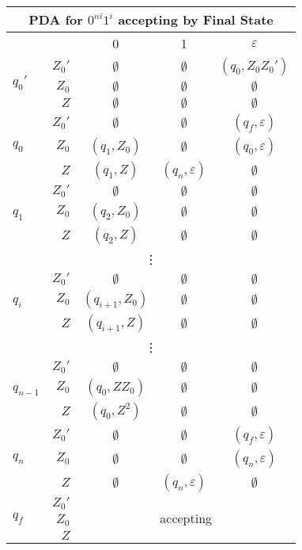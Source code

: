 \begin{center}\begin{tabular}{l r c c c}
    \multicolumn{5}{c}{PDA for \(0^{ni} 1^i\) accepting by Final State}\\\bottomrule
    & & 0 & 1 & \(\varepsilon \) \\\cmidrule{3-5}
    \multirow{3}{*}{\(q_0'\)} & \(Z_0'\) & \(\emptyset \) & \(\emptyset \) & \((q_0, Z_0 Z_0')\) \\
    & \(Z_0\) & \(\emptyset \) & \(\emptyset \) & \(\emptyset \) \\
    & \(Z\) & \(\emptyset \) & \(\emptyset \) & \(\emptyset \) \\\midrule
    \multirow{3}{*}{\(q_0\)}  & \(Z_0'\) & \(\emptyset \) & \(\emptyset \) & \((q_f, \varepsilon)\) \\
    & \(Z_0\) & \((q_1, Z_0)\) & \(\emptyset \) & \((q_0, \varepsilon)\) \\
    & \(Z\) & \((q_1, Z)\) & \((q_n, \varepsilon) \) & \(\emptyset \) \\\midrule
    \multirow{3}{*}{\(q_1\)} & \(Z_0'\) & \(\emptyset \) & \(\emptyset \) & \(\emptyset \) \\
    & \(Z_0\) & \((q_2, Z_0)\) & \(\emptyset \) & \(\emptyset \) \\
    & \(Z\) & \((q_2, Z) \)  & \(\emptyset \) & \(\emptyset \) \\\midrule
    \multicolumn{5}{c}{\vdots}\\\midrule
    \multirow{3}{*}{\(q_i\)} & \(Z_0'\) & \(\emptyset \) & \(\emptyset \) & \(\emptyset \) \\
     & \(Z_0\) & \((q_{i+1}, Z_0)\) & \(\emptyset \) &  \(\emptyset \) \\
    & \(Z\) & \((q_{i+1}, Z) \) & \(\emptyset \) & \(\emptyset \) \\\midrule
    \multicolumn{5}{c}{\vdots}\\\midrule
    \multirow{3}{*}{\(q_{n-1}\)}  & \(Z_0'\) & \(\emptyset \) & \(\emptyset \) & \(\emptyset \) \\
    & \(Z_0\) & \((q_0, ZZ_0)\) & \(\emptyset \) & \(\emptyset \) \\
    & \(Z\)  & \((q_0, Z^2) \) & \(\emptyset \) & \(\emptyset \) \\\midrule
    \multirow{3}{*}{\(q_n\)} & \(Z_0'\) & \(\emptyset \) & \(\emptyset \) & \((q_f, \varepsilon)\) \\
     & \(Z_0\) & \(\emptyset \) & \(\emptyset \) & \((q_n, \varepsilon)\) \\
    & \(Z\) & \(\emptyset \)  & \((q_n, \varepsilon ) \) & \(\emptyset \) \\\midrule
    \multirow{3}{*}{\(q_f\)} & \(Z_0'\) &\multicolumn{3}{c}{\multirow{3}{*}{accepting}} \\
    & \(Z_0\) \\
    & \(Z\)
\end{tabular}\end{center}

